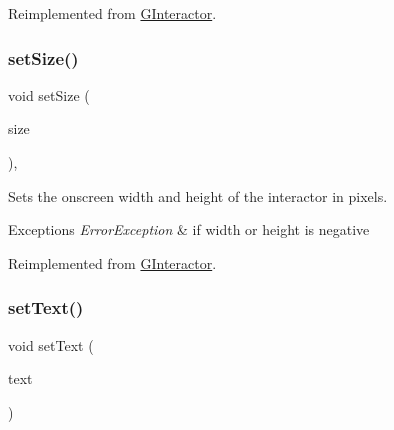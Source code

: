 Reimplemented from \mbox{\hyperlink{classsgl_1_1GInteractor_aca25d49481f9bf5fc8f7df4c086c4ce7}{G\+Interactor}}.

\mbox{\label{classsgl_1_1GLabel_a42d96e60c62d7770993327d7147d77b8}} 
\subsubsection{\texorpdfstring{set\+Size()}{setSize()}\hspace{0.1cm}{\footnotesize\ttfamily [2/2]}}
{\footnotesize\ttfamily void set\+Size (\begin{DoxyParamCaption}\item[{const \mbox{\hyperlink{structsgl_1_1GDimension}{G\+Dimension}} \&}]{size }\end{DoxyParamCaption})\hspace{0.3cm}{\ttfamily [override]}, {\ttfamily [virtual]}}



Sets the onscreen width and height of the interactor in pixels. 


\begin{DoxyExceptions}{Exceptions}
{\em Error\+Exception} & if width or height is negative \\
\hline
\end{DoxyExceptions}


Reimplemented from \mbox{\hyperlink{classsgl_1_1GInteractor_ae2b628228f192c2702c4ce941b2af68f}{G\+Interactor}}.

\mbox{\label{classsgl_1_1GLabel_ac1ae51949d41ee9054634be5967d91b8}} 
\subsubsection{\texorpdfstring{set\+Text()}{setText()}}
{\footnotesize\ttfamily void set\+Text (\begin{DoxyParamCaption}\item[{const std\+::string \&}]{text }\end{DoxyParamCaption})\hspace{0.3cm}{\ttfamily [virtual]}}



